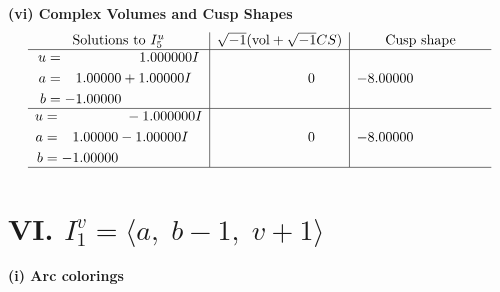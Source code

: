 \documentclass[1p]{elsarticle_modified}
\theoremstyle{definition}
\newcommand{\I}{\sqrt{-1}}
\begin{document}
\newpage\flushleft \textbf{(vi) Complex Volumes and Cusp Shapes}
$$\begin{array}{c|c|c}  
\text{Solutions to }I^u_{5}& \I (\text{vol} + \sqrt{-1}CS) & \text{Cusp shape}\\
 \hline 
\begin{aligned}
u &= \phantom{-0.000000 -}1.000000 I \\
a &= \phantom{-}1.00000 + 1.00000 I \\
b &= -1.00000\phantom{ +0.000000I}\end{aligned}
 & \phantom{-0.000000 } 0 & -8.00000\phantom{ +0.000000I} \\ \hline\begin{aligned}
u &= \phantom{-0.000000 } -1.000000 I \\
a &= \phantom{-}1.00000 - 1.00000 I \\
b &= -1.00000\phantom{ +0.000000I}\end{aligned}
 & \phantom{-0.000000 } 0 & -8.00000\phantom{ +0.000000I}\\
 \hline 
 \end{array}$$\newpage\newpage\renewcommand{\arraystretch}{1}
\centering \section*{VI. $I^v_{1}= \langle a,\;b-1,\;v+1 \rangle$}
\flushleft \textbf{(i) Arc colorings}\\
\end{document}
